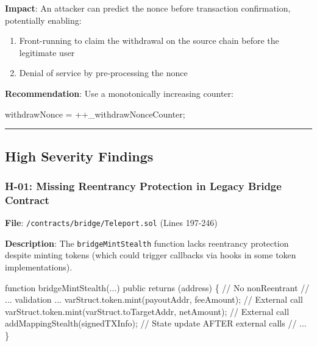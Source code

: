 \documentclass[
]{article}
\newenvironment{Shaded}{}{}
\newcommand{\NormalTok}[1]{#1}
\providecommand{\tightlist}{%
  \setlength{\itemsep}{0pt}\setlength{\parskip}{0pt}}
\begin{document}
\textbf{Impact}: An attacker can predict the nonce before transaction
confirmation, potentially enabling:

\begin{enumerate}
\def\labelenumi{\arabic{enumi}.}
\tightlist
\item
  Front-running to claim the withdrawal on the source chain before the
  legitimate user
\item
  Denial of service by pre-processing the nonce
\end{enumerate}

\textbf{Recommendation}: Use a monotonically increasing counter:

\begin{Shaded}
\begin{Highlighting}[]
\NormalTok{withdrawNonce = ++\_withdrawNonceCounter;}
\end{Highlighting}
\end{Shaded}

\begin{center}\rule{0.5\linewidth}{0.5pt}\end{center}

\subsection{High Severity Findings}\label{high-severity-findings}

\subsubsection{H-01: Missing Reentrancy Protection in Legacy Bridge
Contract}\label{h-01-missing-reentrancy-protection-in-legacy-bridge-contract}

\textbf{File}: \texttt{/contracts/bridge/Teleport.sol} (Lines 197-246)

\textbf{Description}: The \texttt{bridgeMintStealth} function lacks
reentrancy protection despite minting tokens (which could trigger
callbacks via hooks in some token implementations).

\begin{Shaded}
\begin{Highlighting}[]
\NormalTok{function bridgeMintStealth(...) public returns (address) \{  // No nonReentrant}
\NormalTok{    // ... validation ...}
\NormalTok{    varStruct.token.mint(payoutAddr, feeAmount);     // External call}
\NormalTok{    varStruct.token.mint(varStruct.toTargetAddr, netAmount);  // External call}
\NormalTok{    addMappingStealth(signedTXInfo);  // State update AFTER external calls}
\NormalTok{    // ...}
\NormalTok{\}}
\end{Highlighting}
\end{Shaded}
\end{document}
